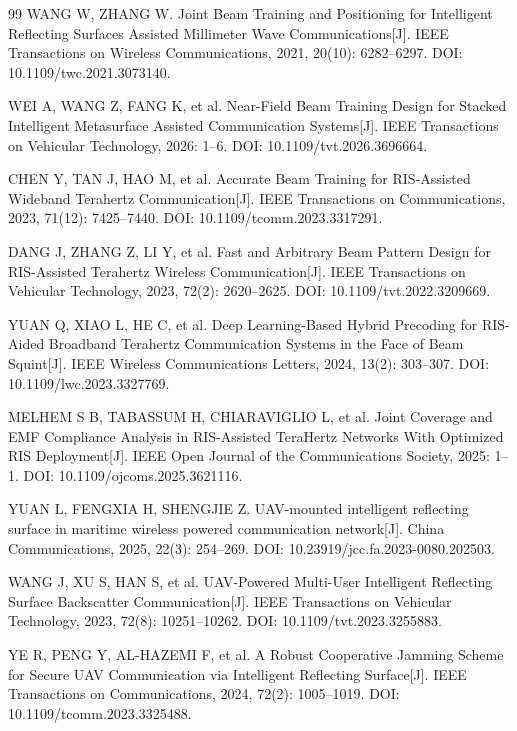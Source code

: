 \begin{thebibliography}{99}
 WANG W, ZHANG W. Joint Beam Training and Positioning for Intelligent Reflecting Surfaces Assisted Millimeter Wave Communications[J]. IEEE Transactions on Wireless Communications, 2021, 20(10): 6282--6297. DOI: 10.1109/twc.2021.3073140.

 WEI A, WANG Z, FANG K, et al. Near-Field Beam Training Design for Stacked Intelligent Metasurface Assisted Communication Systems[J]. IEEE Transactions on Vehicular Technology, 2026: 1--6. DOI: 10.1109/tvt.2026.3696664.

 CHEN Y, TAN J, HAO M, et al. Accurate Beam Training for RIS-Assisted Wideband Terahertz Communication[J]. IEEE Transactions on Communications, 2023, 71(12): 7425--7440. DOI: 10.1109/tcomm.2023.3317291.

 DANG J, ZHANG Z, LI Y, et al. Fast and Arbitrary Beam Pattern Design for RIS-Assisted Terahertz Wireless Communication[J]. IEEE Transactions on Vehicular Technology, 2023, 72(2): 2620--2625. DOI: 10.1109/tvt.2022.3209669.

 YUAN Q, XIAO L, HE C, et al. Deep Learning-Based Hybrid Precoding for RIS-Aided Broadband Terahertz Communication Systems in the Face of Beam Squint[J]. IEEE Wireless Communications Letters, 2024, 13(2): 303--307. DOI: 10.1109/lwc.2023.3327769.

 MELHEM S B, TABASSUM H, CHIARAVIGLIO L, et al. Joint Coverage and EMF Compliance Analysis in RIS-Assisted TeraHertz Networks With Optimized RIS Deployment[J]. IEEE Open Journal of the Communications Society, 2025: 1--1. DOI: 10.1109/ojcoms.2025.3621116.

 YUAN L, FENGXIA H, SHENGJIE Z. UAV-mounted intelligent reflecting surface in maritime wireless powered communication network[J]. China Communications, 2025, 22(3): 254--269. DOI: 10.23919/jcc.fa.2023-0080.202503.

 WANG J, XU S, HAN S, et al. UAV-Powered Multi-User Intelligent Reflecting Surface Backscatter Communication[J]. IEEE Transactions on Vehicular Technology, 2023, 72(8): 10251--10262. DOI: 10.1109/tvt.2023.3255883.

 YE R, PENG Y, AL-HAZEMI F, et al. A Robust Cooperative Jamming Scheme for Secure UAV Communication via Intelligent Reflecting Surface[J]. IEEE Transactions on Communications, 2024, 72(2): 1005--1019. DOI: 10.1109/tcomm.2023.3325488.


\end{thebibliography}
